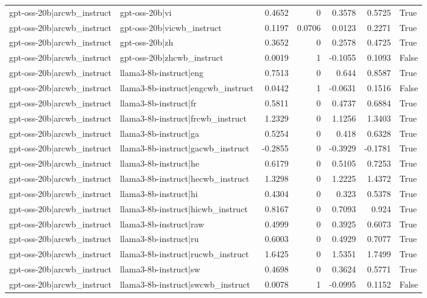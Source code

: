 \begin{table}
\begin{tabular}{l l r r r r l}
gpt-oss-20b|arcwb_instruct & gpt-oss-20b|vi & 0.4652 & 0 & 0.3578 & 0.5725 & True \\
gpt-oss-20b|arcwb_instruct & gpt-oss-20b|vicwb_instruct & 0.1197 & 0.0706 & 0.0123 & 0.2271 & True \\
gpt-oss-20b|arcwb_instruct & gpt-oss-20b|zh & 0.3652 & 0 & 0.2578 & 0.4725 & True \\
gpt-oss-20b|arcwb_instruct & gpt-oss-20b|zhcwb_instruct & 0.0019 & 1 & -0.1055 & 0.1093 & False \\
gpt-oss-20b|arcwb_instruct & llama3-8b-instruct|eng & 0.7513 & 0 & 0.644 & 0.8587 & True \\
gpt-oss-20b|arcwb_instruct & llama3-8b-instruct|engcwb_instruct & 0.0442 & 1 & -0.0631 & 0.1516 & False \\
gpt-oss-20b|arcwb_instruct & llama3-8b-instruct|fr & 0.5811 & 0 & 0.4737 & 0.6884 & True \\
gpt-oss-20b|arcwb_instruct & llama3-8b-instruct|frcwb_instruct & 1.2329 & 0 & 1.1256 & 1.3403 & True \\
gpt-oss-20b|arcwb_instruct & llama3-8b-instruct|ga & 0.5254 & 0 & 0.418 & 0.6328 & True \\
gpt-oss-20b|arcwb_instruct & llama3-8b-instruct|gacwb_instruct & -0.2855 & 0 & -0.3929 & -0.1781 & True \\
gpt-oss-20b|arcwb_instruct & llama3-8b-instruct|he & 0.6179 & 0 & 0.5105 & 0.7253 & True \\
gpt-oss-20b|arcwb_instruct & llama3-8b-instruct|hecwb_instruct & 1.3298 & 0 & 1.2225 & 1.4372 & True \\
gpt-oss-20b|arcwb_instruct & llama3-8b-instruct|hi & 0.4304 & 0 & 0.323 & 0.5378 & True \\
gpt-oss-20b|arcwb_instruct & llama3-8b-instruct|hicwb_instruct & 0.8167 & 0 & 0.7093 & 0.924 & True \\
gpt-oss-20b|arcwb_instruct & llama3-8b-instruct|raw & 0.4999 & 0 & 0.3925 & 0.6073 & True \\
gpt-oss-20b|arcwb_instruct & llama3-8b-instruct|ru & 0.6003 & 0 & 0.4929 & 0.7077 & True \\
gpt-oss-20b|arcwb_instruct & llama3-8b-instruct|rucwb_instruct & 1.6425 & 0 & 1.5351 & 1.7499 & True \\
gpt-oss-20b|arcwb_instruct & llama3-8b-instruct|sw & 0.4698 & 0 & 0.3624 & 0.5771 & True \\
gpt-oss-20b|arcwb_instruct & llama3-8b-instruct|swcwb_instruct & 0.0078 & 1 & -0.0995 & 0.1152 & False \\

\end{tabular}
\end{table}
